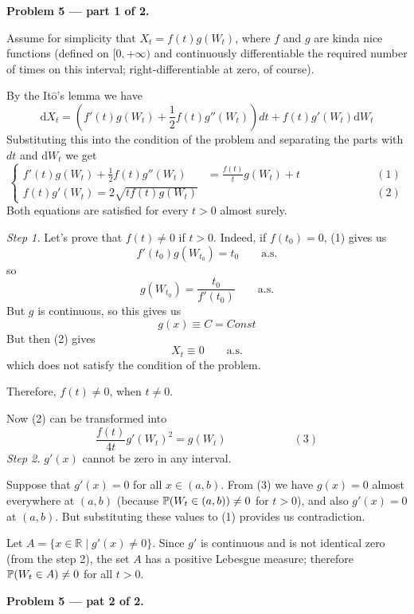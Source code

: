 \documentclass[12pt, a4paper]{article}
\newcommand{\RR}{\mathbb{R}}
\newcommand{\dt}{dt}
\begin{document}
\textbf{Problem 5 — part 1 of 2.}\par
Assume for simplicity that $X_{t} = f(t)g(W_{t})$, where $f$ and $g$ are kinda nice functions (defined on $[0, +\infty)$ and continuously differentiable the required number of times on this interval; right-differentiable at zero, of course).\par
By the It$\hat{\mbox{o}}$'s lemma we have
\[
\mathrm{d}X_{t} = \left(f'(t)g(W_{t}) + \frac{ 1}{ 2}f(t)g''(W_{t})\right)\dt + f(t)g'(W_{t})\mathrm{d}W_{t}
\]
Substituting this into the condition of the problem and separating the parts with $\dt$ and $\mathrm{d}W_{t}$ we get
\[
\left\{
\begin{aligned}
f'(t)g(W_{t})+\frac{ 1}{ 2}f(t)g''(W_{t})  &= \frac{ f(t)}{ t}g(W_{t}) + t\qquad\qquad\qquad &(1)\\
 f(t)g'(W_{t}) = 2\sqrt{tf(t)g(W_{t})} & \qquad\qquad\qquad &(2)
\end{aligned}
\right.
\]
Both equations are satisfied for every $t > 0$ almost surely.\[\]\par
\textit{Step 1.} Let's prove that $f(t) \neq 0$ if $t > 0$. Indeed, if $f(t_{0}) = 0$, (1) gives us
\[
f'(t_{0}) g(W_{t_{0}}) = t_{0}\qquad \mbox{a.s.}
\]
so
\[
g(W_{t_{0}}) = \frac{ t_{0}}{ f'(t_{0})}\qquad \mbox{a.s.}
\]
But $g$ is continuous, so this gives us
\[
g(x) \equiv C = Const
\]
But then (2) gives
\[
X_{t} \equiv 0 \qquad \text{a.s.}
\]
which does not satisfy the condition of the problem.\par
Therefore, $f(t) \neq 0$, when $t \neq 0$.\[\]\par
Now (2) can be transformed into
\[
\frac{ f(t)}{ 4t}g'(W_{t})^{2} = g(W_{t})\qquad\qquad\qquad (3)
\]
\textit{Step 2.} $g'(x)$ cannot be zero in any interval.\par
Suppose that $g'(x) = 0$ for all $x \in (a,b)$. From (3) we have $g(x) = 0$ almost everywhere at $(a,b)$ (because $\P(W_{t} \in (a,b)) \neq 0$ for $t > 0$), and also $g'(x) = 0$ at $(a,b)$. 
But substituting these values to (1) provides us contradiction.\[\]\par
Let $A = \{x \in \RR \mid g'(x) \neq 0\}$. 
Since $g'$ is continuous and is not identical zero (from the step 2), the set $A$ has a positive Lebesgue measure; therefore $\P(W_{t} \in A) \neq 0$ for all $t > 0$.







\textbf{Problem 5 — pat 2 of 2.}\par
\end{document}
